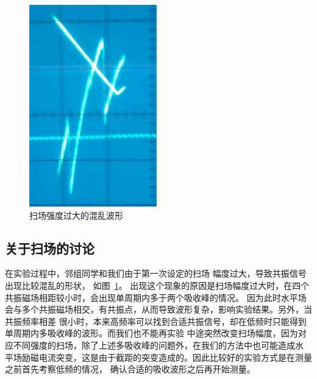 \documentclass[11pt,a4paper]{article}
\begin{document}
\begin{spacing}{1.3}
\begin{CJK*}{UTF8}{gbsn}
\begin{figure}[h]
\centering
\includegraphics[width=.2\textwidth]{chaos}
\caption{扫场强度过大的混乱波形}
\label{fig:chaos}
\end{figure}
\subsection{关于扫场的讨论}	
在实验过程中，邻组同学和我们由于第一次设定的扫场
幅度过大，导致共振信号出现比较混乱的形状，
如图~\ref{fig:chaos}。
出现这个现象的原因是扫场幅度过大时，在四个共振磁场相距较小时，会出现单周期内多于两个吸收峰的情况。
因为此时水平场会与多个共振磁场相交，有共振点，从而导致波形复杂，影响实验结果。另外，当共振频率相差
很小时，本来高频率可以找到合适共振信号，却在低频时只能得到单周期内多吸收峰的波形。而我们也不能再实验
中途突然改变扫场幅度，因为对应不同强度的扫场，除了上述多吸收峰的问题外，在我们的方法中也可能造成水
平场励磁电流突变，这是由于截距的突变造成的。因此比较好的实验方式是在测量之前首先考察低频的情况，
确认合适的吸收波形之后再开始测量。


\end{CJK*}
\end{spacing}
\end{document}
